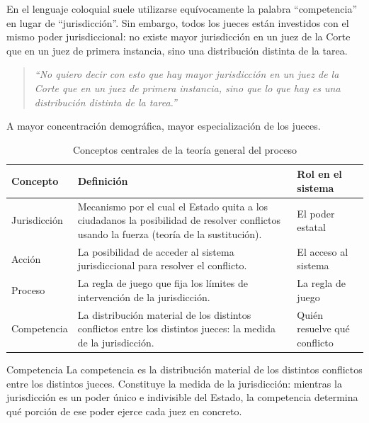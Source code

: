 \documentclass[12pt,oneside]{book}
\begin{document}
En el lenguaje coloquial suele utilizarse equívocamente la palabra ``competencia'' en lugar de ``jurisdicción''. Sin embargo, todos los jueces están investidos con el mismo poder jurisdiccional: no existe mayor jurisdicción en un juez de la Corte que en un juez de primera instancia, sino una distribución distinta de la tarea.

\begin{quote}
\itshape
``No quiero decir con esto que hay mayor jurisdicción en un juez de la Corte que en un juez de primera instancia, sino que lo que hay es una distribución distinta de la tarea.''
\end{quote}

A mayor concentración demográfica, mayor especialización de los jueces.

\begin{table}[H]
\centering
\caption{Conceptos centrales de la teoría general del proceso}
\begin{tabularx}{\textwidth}{>{\raggedright\arraybackslash}p{} X >{\raggedright\arraybackslash}p{}}
\toprule
\textbf{Concepto} & \textbf{Definición} & \textbf{Rol en el sistema} \\
\midrule
Jurisdicción & Mecanismo por el cual el Estado quita a los ciudadanos la posibilidad de resolver conflictos usando la fuerza (teoría de la sustitución). & El poder estatal \\
Acción & La posibilidad de acceder al sistema jurisdiccional para resolver el conflicto. & El acceso al sistema \\
Proceso & La regla de juego que fija los límites de intervención de la jurisdicción. & La regla de juego \\
Competencia & La distribución material de los distintos conflictos entre los distintos jueces: la medida de la jurisdicción. & Quién resuelve qué conflicto \\
\bottomrule
\end{tabularx}
\end{table}

\begin{definition}{Competencia}
La competencia es la distribución material de los distintos conflictos entre los distintos jueces. Constituye la medida de la jurisdicción: mientras la jurisdicción es un poder único e indivisible del Estado, la competencia determina qué porción de ese poder ejerce cada juez en concreto.
\end{definition}
\end{document}
